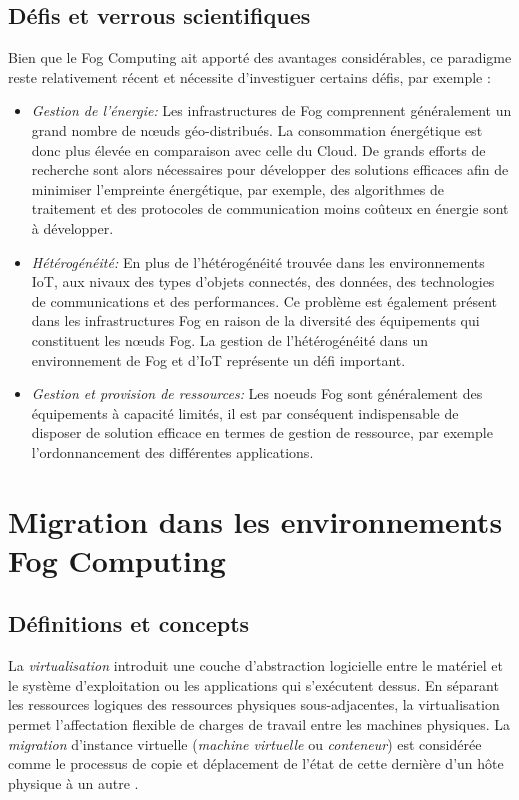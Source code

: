 \subsection{Défis et verrous scientifiques}
Bien que le Fog Computing ait apporté des avantages considérables, ce paradigme reste relativement récent et nécessite  d'investiguer certains défis, par exemple :
\begin{itemize}
  \item \emph{Gestion de l'énergie:} Les infrastructures de Fog comprennent généralement un grand nombre de nœuds géo-distribués. La consommation énergétique est donc plus élevée en comparaison avec celle du Cloud. De grands efforts de recherche sont alors nécessaires pour développer des solutions efficaces afin de minimiser l'empreinte énergétique, par exemple, des algorithmes de traitement et des protocoles de communication moins coûteux en énergie sont à développer.
  \item \emph{Hétérogénéité:} En plus de l'hétérogénéité trouvée dans les environnements IoT, aux nivaux des types d'objets connectés, des données, des technologies de communications et des performances. Ce problème est également présent dans les infrastructures Fog en raison de la diversité des équipements qui constituent les nœuds Fog. La gestion de l'hétérogénéité dans un environnement de Fog et d'IoT représente un défi important.
  \item \emph{Gestion et provision de ressources:} Les noeuds Fog sont généralement des équipements à capacité limités, il est par conséquent indispensable de disposer de solution efficace en termes de gestion de ressource, par exemple l'ordonnancement des différentes applications.
\end{itemize}
\section{Migration dans les environnements Fog Computing}

\subsection{Définitions et concepts}
La \emph{\gls{virtualisation}} introduit une couche d'abstraction logicielle entre le matériel et le système d'exploitation ou les applications qui s'exécutent dessus. En séparant les ressources logiques des ressources physiques sous-adjacentes, la virtualisation permet l'affectation flexible de charges de travail entre les machines physiques.
La \emph{\gls{migration}} d'instance virtuelle (\emph{\gls{machine virtuelle}} ou \emph{\gls{conteneur}}) est considérée comme le processus de copie et déplacement de l'état de cette dernière d'un hôte physique à un autre \cite{boutaba2013}.\par
